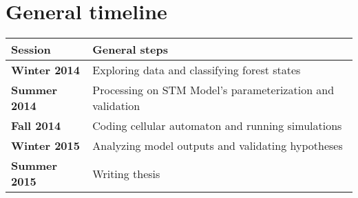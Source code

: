 \section{General timeline}
\vspace{-0.5em}
\begin{table}[h]
\centering
\begin{tabular}{|l|l|}
\hline
\textbf{Session} & \textbf{General steps}                                    \\ \hline
\textbf{Winter 2014}      & Exploring data and classifying forest states              \\
\textbf{Summer 2014}      & Processing on STM Model's parameterization and validation \\
\textbf{Fall 2014}        & Coding cellular automaton and running simulations         \\
\textbf{Winter 2015}      & Analyzing model outputs and validating hypotheses      \\
\textbf{Summer 2015}      & Writing thesis                                            \\ \hline
\end{tabular}
\end{table}



\clearpage


